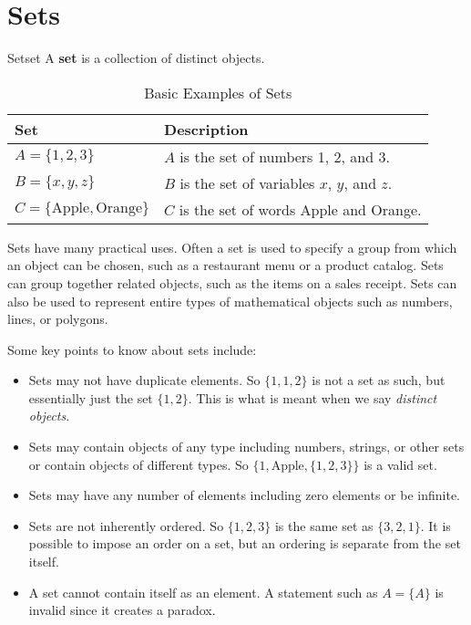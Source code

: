 \section{Sets}

\begin{definition}{Set}{set}
  A \textbf{set} is a collection of distinct objects.
\end{definition}
\begin{table}[H]
  \centering
  \begin{tabular}{p{1.5in} p{3in}}
    \toprule
    \textbf{Set} & \textbf{Description} \\
    \midrule
    \( A = \{ 1, 2, 3 \} \) & \( A \) is the set of numbers 1, 2, and 3. \\
    \( B = \{ x, y, z \} \) & \( B \) is the set of variables \(x\), \(y\), and \(z\). \\
    \( C = \{ \text{Apple}, \text{Orange} \} \) & \( C \) is the set of words Apple and Orange. \\
    \bottomrule
  \end{tabular}
  \caption{Basic Examples of Sets}
\end{table}

Sets have many practical uses. Often a set is used to specify a group from which
an object can be chosen, such as a restaurant menu or a product catalog. Sets can
group together related objects, such as the items on a sales receipt.
Sets can also be used to represent entire types of mathematical objects such as
numbers, lines, or polygons.

Some key points to know about sets include:
\begin{itemize}
  \item Sets may not have duplicate elements. So \( \{ 1, 1, 2 \} \) is not a set
     as such, but essentially just the set \( \{ 1, 2 \} \).
   This is what is meant when we say \emph{distinct objects}.
  \item Sets may contain objects of any type including numbers, strings, or other sets
   or contain objects of different types. So \( \{ 1, \text{Apple}, \{ 1, 2, 3\} \} \) is a valid set.
  \item Sets may have any number of elements including zero elements or be infinite.
  \item Sets are not inherently ordered. So \( \{ 1, 2, 3 \} \) is the same set as \( \{ 3, 2, 1 \} \).
   It is possible to impose an order on a set, but an ordering is separate from the set itself.
  \item A set cannot contain itself as an element. A statement such as \( A = \{ A \} \)
    is invalid since it creates a paradox.
\end{itemize}

